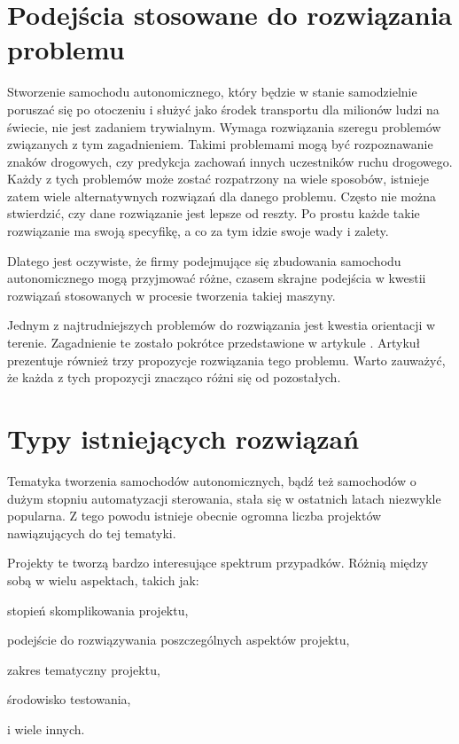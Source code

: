 \section{Podejścia stosowane do rozwiązania problemu}
Stworzenie samochodu autonomicznego, który będzie w stanie samodzielnie poruszać się po otoczeniu i służyć jako środek transportu dla milionów ludzi na świecie, nie jest zadaniem trywialnym. Wymaga rozwiązania szeregu problemów związanych z tym zagadnieniem. Takimi problemami mogą być rozpoznawanie znaków drogowych, czy predykcja zachowań innych uczestników ruchu drogowego. Każdy z tych problemów może zostać rozpatrzony na wiele sposobów, istnieje zatem wiele alternatywnych rozwiązań dla danego problemu. Często nie można stwierdzić, czy dane rozwiązanie jest lepsze od reszty. Po prostu każde takie rozwiązanie ma swoją specyfikę, a co za tym idzie swoje wady i zalety.

Dlatego jest oczywiste, że firmy podejmujące się zbudowania samochodu autonomicznego mogą przyjmować różne, czasem skrajne podejścia w kwestii rozwiązań stosowanych w procesie tworzenia takiej maszyny.

Jednym z najtrudniejszych problemów do rozwiązania jest kwestia orientacji w terenie. Zagadnienie te zostało pokrótce przedstawione w artykule \cite{threeApproachesToOrientation}.
Artykuł prezentuje również trzy propozycje rozwiązania tego problemu. Warto zauważyć, że każda z tych propozycji znacząco różni się od pozostałych.

\section{Typy istniejących rozwiązań}
Tematyka tworzenia samochodów autonomicznych, bądź też samochodów o dużym stopniu automatyzacji sterowania, stała się w ostatnich latach niezwykle popularna. Z tego powodu istnieje obecnie ogromna liczba projektów nawiązujących do tej tematyki.

Projekty te tworzą bardzo interesujące spektrum przypadków. Różnią między sobą w wielu aspektach, takich jak:
\begin{itemize*}
\item stopień skomplikowania projektu,
\item podejście do rozwiązywania poszczególnych aspektów projektu,
\item zakres tematyczny projektu,
\item środowisko testowania,
\item i wiele innych.
\end{itemize*}

